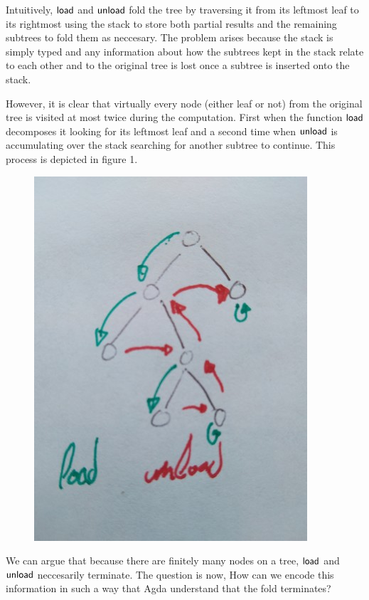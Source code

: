 \documentclass[sigplan,10pt,review]{acmart}
\newcommand{\AF}{\AgdaFunction}
\begin{document}
Intuitively, \ensuremath{\AF{load}} and \ensuremath{\AF{unload}} fold the tree by traversing it from
its leftmost leaf to its rightmost using the stack to store both
partial results and the remaining subtrees to fold them as
neccesary. The problem arises because the stack is simply typed and
any information about how the subtrees kept in the stack relate to
each other and to the original tree is lost once a subtree is inserted
onto the stack.

However, it is clear that virtually every node (either leaf or not)
from the original tree is visited at most twice during the
computation. First when the function \ensuremath{\AF{load}} decomposes it looking for
its leftmost leaf and a second time when \ensuremath{\AF{unload}} is accumulating over
the stack searching for another subtree to continue. This process is
depicted in figure 1.

\begin{figure}[h]
  \includegraphics[scale=0.25]{figure1}
\end{figure}

We can argue that because there are finitely many nodes on a tree,
\ensuremath{\AF{load}} and \ensuremath{\AF{unload}} neccesarily terminate. The question is now, How
can we encode this information in such a way that Agda understand that
the fold terminates?
\end{document}
